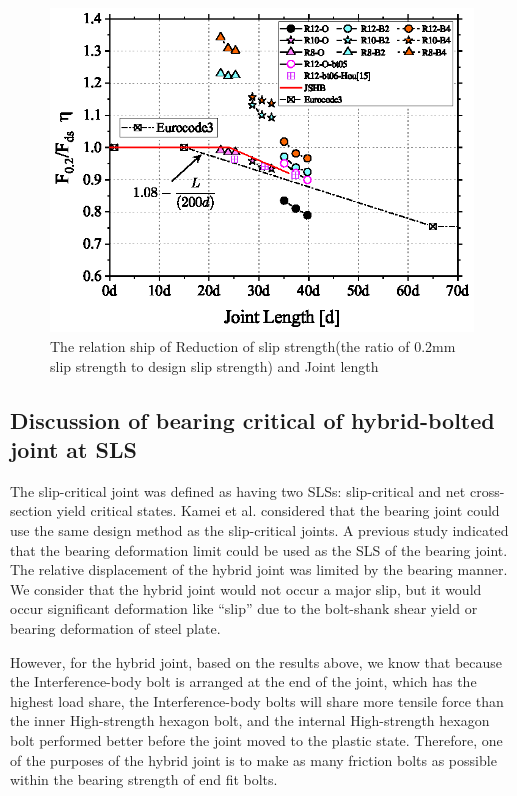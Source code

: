 \begin{figure}[htbp]
    \centering
    \includegraphics[width=0.75\linewidth]{imgs/ch5/F02-Fds-L-eq-new.eps}
    \caption{The relation ship of Reduction of slip strength(the ratio of 0.2mm slip strength to design slip strength) and Joint length}
    \label{fig-fdsredu}
\end{figure}

\subsection{Discussion of bearing critical of hybrid-bolted joint at SLS}

The slip-critical joint was defined as having two SLSs: slip-critical and net cross-section yield critical states. Kamei et al. \cite{kamei2010} considered that the bearing joint could use the same design method as the slip-critical joints. A previous study indicated that the bearing deformation limit could be used \cite{Rex2003,TODA2014} as the SLS of the bearing joint. The relative displacement of the hybrid joint was limited by the bearing manner. We consider that the hybrid joint would not occur a major slip, but it would occur significant deformation like ``slip'' due to the bolt-shank shear yield or bearing deformation of steel plate.

However, for the hybrid joint, based on the results above, we know that because the Interference-body bolt is arranged at the end of the joint, which has the highest load share, the Interference-body bolts will share more tensile force than the inner High-strength hexagon bolt, and the internal High-strength hexagon bolt performed better before the joint moved to the plastic state. Therefore, one of the purposes of the hybrid joint is to make as many friction bolts as possible within the bearing strength of end fit bolts.

